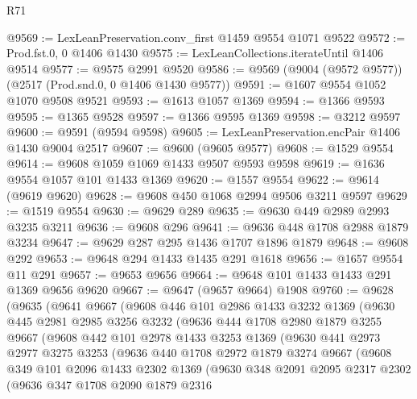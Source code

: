 \begin{lexlean}{R71}
\begin{coremodule}
@9569 := LexLeanPreservation.conv_first @1459 @9554 @1071 @9522
@9572 := Prod.fst.{0, 0} @1406 @1430
@9575 := LexLeanCollections.iterateUntil @1406 @9514
@9577 := @9575 @2991 @9520
@9586 := @9569 (@9004 (@9572 @9577)) (@2517 (Prod.snd.{0, 0} @1406 @1430 @9577))
@9591 := @1607 @9554 @1052 @1070 @9508 @9521
@9593 := @1613 @1057 @1369
@9594 := @1366 @9593
@9595 := @1365 @9528
@9597 := @1366 @9595 @1369
@9598 := @3212 @9597
@9600 := @9591 (@9594 @9598)
@9605 := LexLeanPreservation.encPair @1406 @1430 @9004 @2517
@9607 := @9600 (@9605 @9577)
@9608 := @1529 @9554
@9614 := @9608 @1059 @1069 @1433 @9507 @9593 @9598
@9619 := @1636 @9554 @1057 @101 @1433 @1369
@9620 := @1557 @9554
@9622 := @9614 (@9619 @9620)
@9628 := @9608 @450 @1068 @2994 @9506 @3211 @9597
@9629 := @1519 @9554
@9630 := @9629 @289
@9635 := @9630 @449 @2989 @2993 @3235 @3211
@9636 := @9608 @296
@9641 := @9636 @448 @1708 @2988 @1879 @3234
@9647 := @9629 @287 @295 @1436 @1707 @1896 @1879
@9648 := @9608 @292
@9653 := @9648 @294 @1433 @1435 @291 @1618
@9656 := @1657 @9554 @11 @291
@9657 := @9653 @9656
@9664 := @9648 @101 @1433 @1433 @291 @1369 @9656 @9620
@9667 := @9647 (@9657 @9664) @1908
@9760 := @9628
    (@9635
      (@9641
        @9667
        (@9608
          @446
          @101
          @2986
          @1433
          @3232
          @1369
          (@9630
            @445
            @2981
            @2985
            @3256
            @3232
            (@9636
              @444
              @1708
              @2980
              @1879
              @3255
              @9667
              (@9608
                @442
                @101
                @2978
                @1433
                @3253
                @1369
                (@9630
                  @441
                  @2973
                  @2977
                  @3275
                  @3253
                  (@9636
                    @440
                    @1708
                    @2972
                    @1879
                    @3274
                    @9667
                    (@9608
                      @349
                      @101
                      @2096
                      @1433
                      @2302
                      @1369
                      (@9630
                        @348
                        @2091
                        @2095
                        @2317
                        @2302
                        (@9636
                          @347
                          @1708
                          @2090
                          @1879
                          @2316

\end{coremodule}
\end{lexlean}
